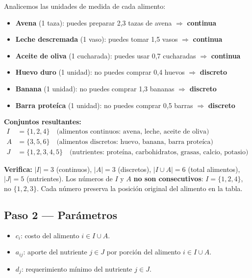 \documentclass[12pt]{article}
\begin{document}
Analicemos las unidades de medida de cada alimento:

\begin{itemize}
    \item \textbf{Avena} (1 taza): puedes preparar 2,3 tazas de avena $\Rightarrow$ \textbf{continua}
    \item \textbf{Leche descremada} (1 vaso): puedes tomar 1,5 vasos $\Rightarrow$ \textbf{continua}
    \item \textbf{Aceite de oliva} (1 cucharada): puedes usar 0,7 cucharadas $\Rightarrow$ \textbf{continua}
    \item \textbf{Huevo duro} (1 unidad): no puedes comprar 0,4 huevos $\Rightarrow$ \textbf{discreto}
    \item \textbf{Banana} (1 unidad): no puedes comprar 1,3 bananas $\Rightarrow$ \textbf{discreto}
    \item \textbf{Barra prote\'ica} (1 unidad): no puedes comprar 0,5 barras $\Rightarrow$ \textbf{discreto}
\end{itemize}

\begin{cajazul}
\textbf{Conjuntos resultantes:}
\begin{align*}
    I &= \{1, 2, 4\} \quad \text{(alimentos continuos: avena, leche, aceite de oliva)} \\
    A &= \{3, 5, 6\} \quad \text{(alimentos discretos: huevo, banana, barra prote\'ica)} \\
    J &= \{1, 2, 3, 4, 5\} \quad \text{(nutrientes: prote\'ina, carbohidratos, grasas, calcio, potasio)}
\end{align*}
\end{cajazul}

\begin{cajanota}
\textbf{Verifica:} $|I| = 3$ (continuos), $|A| = 3$ (discretos), $|I \cup A| = 6$ (total alimentos), $|J| = 5$ (nutrientes). Los n\'umeros de $I$ y $A$ \textbf{no son consecutivos}: $I = \{1,2,4\}$, no $\{1,2,3\}$. Cada n\'umero preserva la posici\'on original del alimento en la tabla.
\end{cajanota}

\subsection{Paso 2 --- Par\'ametros}

\begin{itemize}
    \item $c_i$: costo del alimento $i \in I \cup A$.
    \item $a_{ij}$: aporte del nutriente $j \in J$ por porci\'on del alimento $i \in I \cup A$.
    \item $d_j$: requerimiento m\'inimo del nutriente $j \in J$.
\end{itemize}
\end{document}
